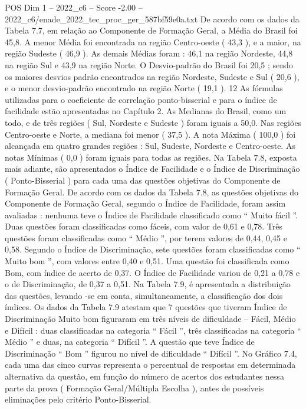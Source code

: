 \begin{textsample}{POS Dim 1 – 2022\_c6 – Score -2.00 – 2022\_c6/enade\_2022\_tec\_proc\_ger\_587bf59e0a.txt}
De acordo com os dados da Tabela 7.7, em relação ao Componente de Formação Geral, a Média do Brasil foi 45,8.
A menor Média foi encontrada na região Centro-oeste ( 43,3 ), e a maior, na região Sudeste ( 46,9 ).
As demais Médias foram : 46,1 na região Nordeste, 44,8 na região Sul e 43,9 na região Norte.
O Desvio-padrão do Brasil foi 20,5 ; sendo os maiores desvios padrão encontrados na região Nordeste, Sudeste e Sul ( 20,6 ), e o menor desvio-padrão encontrado na região Norte ( 19,1 ). 12 As fórmulas utilizadas para o coeficiente de correlação ponto-bisserial e para o índice de facilidade estão apresentadas no Capítulo 2.
As Medianas do Brasil, como um todo, e de três regiões ( Sul, Nordeste e Sudeste ) foram iguais a 50,0.
Nas regiões Centro-oeste e Norte, a mediana foi menor ( 37,5 ).
A nota Máxima ( 100,0 ) foi alcançada em quatro grandes regiões : Sul, Sudeste, Nordeste e Centro-oeste.
As notas Mínimas ( 0,0 ) foram iguais para todas as regiões.
Na Tabela 7.8, exposta mais adiante, são apresentados o Índice de Facilidade e o Índice de Discriminação ( Ponto-Bisserial ) para cada uma das questões objetivas do Componente de Formação Geral.
De acordo com os dados da Tabela 7.8, as questões objetivas do Componente de Formação Geral, segundo o Índice de Facilidade, foram assim avaliadas : nenhuma teve o Índice de Facilidade classificado como “ Muito fácil ”.
Duas questões foram classificadas como fáceis, com valor de 0,61 e 0,78.
Três questões foram classificadas como “ Médio ”, por terem valores de 0,44, 0,45 e 0,58.
Segundo o Índice de Discriminação, sete questões foram classificadas como “ Muito bom ”, com valores entre 0,40 e 0,51.
Uma questão foi classificada como Bom, com índice de acerto de 0,37.
O Índice de Facilidade variou de 0,21 a 0,78 e o de Discriminação, de 0,37 a 0,51.
Na Tabela 7.9, é apresentada a distribuição das questões, levando -se em conta, simultaneamente, a classificação dos dois índices.
Os dados da Tabela 7.9 atestam que 7 questões que tiveram Índice de Discriminação Muito bom figuraram em três níveis de dificuldade – Fácil, Médio e Difícil : duas classificadas na categoria “ Fácil ”, três classificadas na categoria “ Médio ” e duas, na categoria “ Difícil ”.
A questão que teve Índice de Discriminação “ Bom ” figurou no nível de dificuldade “ Difícil ”.
No Gráfico 7.4, cada uma das cinco curvas representa o percentual de respostas em determinada alternativa da questão, em função do número de acertos dos estudantes nessa parte da prova ( Formação Geral/Múltipla Escolha ), antes de possíveis eliminações pelo critério Ponto-Bisserial.

\end{textsample}
